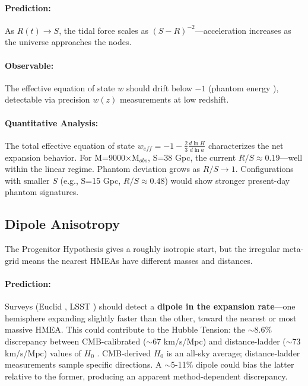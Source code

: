 \documentclass{article}
\begin{document}
\paragraph{Prediction:} As $R(t) \rightarrow S$, the tidal force scales as $(S-R)^{-2}$—acceleration increases as the universe approaches the nodes.

\paragraph{Observable:} The effective equation of state $w$ should drift below $-1$ (phantom energy \cite{Caldwell2003}), detectable via precision $w(z)$ measurements at low redshift.

\paragraph{Quantitative Analysis:}
The total effective equation of state $w_{eff} = -1 - \frac{2}{3}\frac{d \ln H}{d \ln a}$ characterizes the net expansion behavior.
For M=9000$\times$M$_{obs}$, S=38 Gpc, the current $R/S \approx 0.19$—well within the linear regime.
Phantom deviation grows as $R/S \rightarrow 1$.
Configurations with smaller $S$ (e.g., S=15 Gpc, $R/S \approx 0.48$) would show stronger present-day phantom signatures.

\subsection{Dipole Anisotropy}
\label{sec:dipole}
The Progenitor Hypothesis gives a roughly isotropic start, but the irregular meta-grid means the nearest HMEAs have different masses and distances.

\paragraph{Prediction:} Surveys (Euclid \cite{Euclid2011}, LSST \cite{LSST2019}) should detect a \textbf{dipole in the expansion rate}—one hemisphere expanding slightly faster than the other, toward the nearest or most massive HMEA.
This could contribute to the Hubble Tension: the $\sim$8.6\% discrepancy between CMB-calibrated ($\sim$67 km/s/Mpc) and distance-ladder ($\sim$73 km/s/Mpc) values of $H_0$ \cite{Riess2022, DiValentino2021}.
CMB-derived $H_0$ is an all-sky average; distance-ladder measurements sample specific directions.
A $\sim$5-11\% dipole could bias the latter relative to the former, producing an apparent method-dependent discrepancy.
\end{document}
